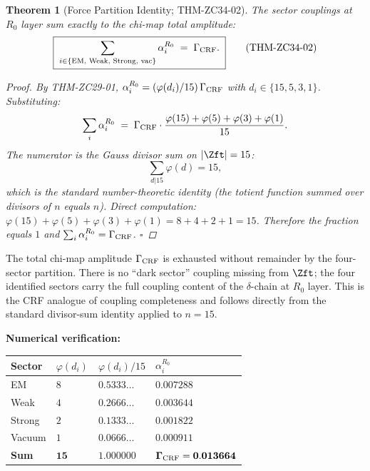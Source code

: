 \documentclass[12pt, a4paper]{article}
\newtheorem{theorem}{Theorem}[section]
\begin{document}
\begin{theorem}[Force Partition Identity; THM-ZC34-02]
\label{thm:zc34-02}
The sector couplings at $R_0$ layer sum exactly to the chi-map
total amplitude:
\begin{equation}
  \boxed{\;\sum_{i \in \{\text{EM, Weak, Strong, vac}\}}
    \alpha_i^{R_0} \;=\; \Gamma_{\rm CRF}.\;}
  \tag{THM-ZC34-02}\label{eq:thm-zc34-02}
\end{equation}

\begin{proof}
By THM-ZC29-01, $\alpha_i^{R_0} = (\varphi(d_i)/15)\,\Gamma_{\rm CRF}$
with $d_i \in \{15, 5, 3, 1\}$. Substituting:
\[
  \sum_i \alpha_i^{R_0}
  \;=\; \Gamma_{\rm CRF}\cdot
  \frac{\varphi(15) + \varphi(5) + \varphi(3) + \varphi(1)}{15}.
\]
The numerator is the Gauss divisor sum on $|\Zft| = 15$:
\[
  \sum_{d | 15} \varphi(d) = 15,
\]
which is the standard number-theoretic identity (the totient
function summed over divisors of $n$ equals $n$). Direct
computation: $\varphi(15) + \varphi(5) + \varphi(3) + \varphi(1)
= 8 + 4 + 2 + 1 = 15$. Therefore the fraction equals $1$ and
$\sum_i \alpha_i^{R_0} = \Gamma_{\rm CRF}$.
\hfill$\square$
\end{proof}
\end{theorem}

\begin{derivedbox}[title={Physical meaning: CRF force structure
  is complete}]
The total chi-map amplitude $\Gamma_{\rm CRF}$ is exhausted
without remainder by the four-sector partition. There is no
``dark sector'' coupling missing from $\Zft$; the four
identified sectors carry the full coupling content of the
$\delta$-chain at $R_0$ layer. This is the CRF analogue of
coupling completeness and follows directly from the standard
divisor-sum identity applied to $n = 15$.

\medskip
\textbf{Numerical verification:}

{\small
\renewcommand{\arraystretch}{1.30}
\begin{center}
\begin{tabular}{p{2.0cm}p{1.2cm}p{2.5cm}p{3.2cm}}
\toprule
\textbf{Sector} & $\varphi(d_i)$ & $\varphi(d_i)/15$ & $\alpha_i^{R_0}$\\
\midrule
EM      & $8$ & $0.5333\ldots$ & $0.007288$\\
Weak    & $4$ & $0.2666\ldots$ & $0.003644$\\
Strong  & $2$ & $0.1333\ldots$ & $0.001822$\\
Vacuum  & $1$ & $0.0666\ldots$ & $0.000911$\\
\midrule
\textbf{Sum} & $\mathbf{15}$ & $\mathbf{1.000000}$
  & $\mathbf{\Gamma_{\rm CRF} = 0.013664}$\\
\bottomrule
\end{tabular}
\end{center}
}
\end{derivedbox}
\end{document}
